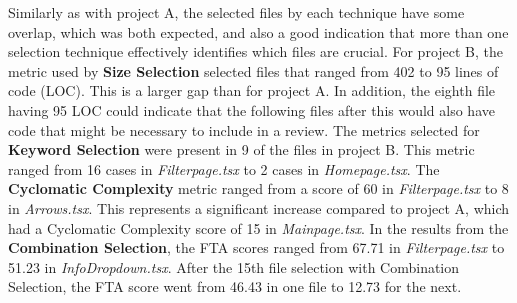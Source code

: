 Similarly as with project A, the selected files by each technique have some overlap, which was both expected, and also a good indication that more than one selection technique effectively identifies which files are crucial. 
For project B, the metric used by \textbf{Size Selection} selected files that ranged from 402 to 95 lines of code (LOC). This is a larger gap than for project A. In addition, the eighth file having 95 LOC could indicate that the following files after this would also have code that might be necessary to include in a review.
The metrics selected for \textbf{Keyword Selection} were present in 9 of the files in project B. This metric ranged from 16 cases in \textit{Filterpage.tsx} to 2 cases in \textit{Homepage.tsx}.
The \textbf{Cyclomatic Complexity} metric ranged from a score of 60 in \textit{Filterpage.tsx} to 8 in \textit{Arrows.tsx}. This represents a significant increase compared to project A, which had a Cyclomatic Complexity score of 15 in \textit{Mainpage.tsx}.
In the results from the \textbf{Combination Selection}, the FTA scores ranged from 67.71 in \textit{Filterpage.tsx} to 51.23 in \textit{InfoDropdown.tsx}. After the 15th file selection with Combination Selection, the FTA score went from 46.43 in one file to 12.73 for the next.


